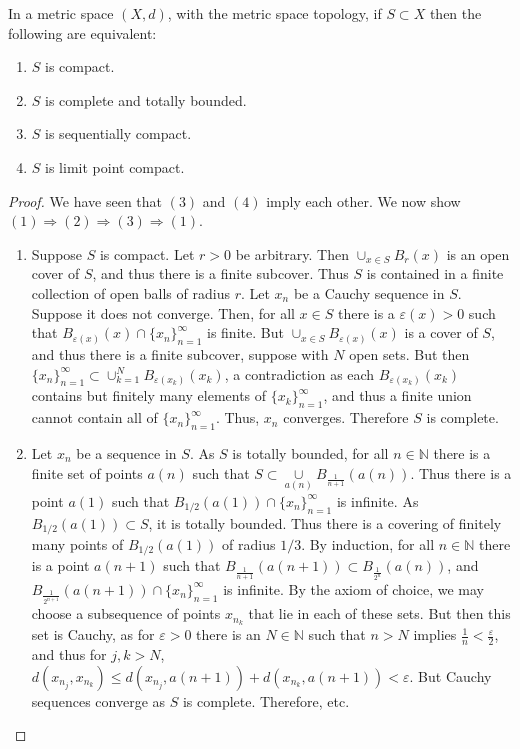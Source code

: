 \documentclass[crop=false,class=article,oneside]{standalone}
\begin{document}
        \begin{theorem}
        In a metric space $(X,d)$, with the metric space topology, if $S\subset X$ then the following are equivalent:
        \begin{enumerate}
        \item $S$ is compact.
        \item $S$ is complete and totally bounded.
        \item $S$ is sequentially compact.
        \item $S$ is limit point compact.
        \end{enumerate}
        \end{theorem}
        \begin{proof}
        We have seen that $(3)$ and $(4)$ imply each other. We now show $(1)\Rightarrow (2)\Rightarrow (3) \Rightarrow (1)$.
        \begin{enumerate}
        \item Suppose $S$ is compact. Let $r>0$ be arbitrary. Then $\cup_{x\in S}B_{r}(x)$ is an open cover of $S$, and thus there is a finite subcover. Thus $S$ is contained in a finite collection of open balls of radius $r$. Let $x_n$ be a Cauchy sequence in $S$. Suppose it does not converge. Then, for all $x\in S$ there is a $\varepsilon(x)>0$ such that $B_{\varepsilon(x)}(x)\cap \{x_n\}_{n=1}^{\infty}$ is finite. But $\cup_{x\in S}B_{\varepsilon(x)}(x)$ is a cover of $S$, and thus there is a finite subcover, suppose with $N$ open sets. But then $\{x_n\}_{n=1}^{\infty}\subset \cup_{k=1}^{N}B_{\varepsilon(x_k)}(x_k)$, a contradiction as each $B_{\varepsilon(x_k)}(x_k)$ contains but finitely many elements of $\{x_k\}_{n=1}^{\infty}$, and thus a finite union cannot contain all of $\{x_n\}_{n=1}^{\infty}$. Thus, $x_n$ converges. Therefore $S$ is complete.
        \item Let $x_n$ be a sequence in $S$. As $S$ is totally bounded, for all $n\in \mathbb{N}$ there is a finite set of points $a(n)$ such that $S\subset \underset{a(n)}\cup B_{\frac{1}{n+1}}(a(n))$. Thus there is a point $a(1)$ such that $B_{1/2}(a(1))\cap \{x_n\}_{n=1}^{\infty}$ is infinite. As $B_{1/2}(a(1))\subset S$, it is totally bounded. Thus there is a covering of finitely many points of $B_{1/2}(a(1))$ of radius $1/3$. By induction, for all $n\in \mathbb{N}$ there is a point $a(n+1)$ such that $B_{\frac{1}{n+1}}(a(n+1))\subset B_{\frac{1}{2^{n}}}(a(n))$, and $B_{\frac{1}{2^{n+1}}}(a(n+1))\cap \{x_n\}_{n=1}^{\infty}$ is infinite. By the axiom of choice, we may choose a subsequence of points $x_{n_k}$ that lie in each of these sets. But then this set is Cauchy, as for $\varepsilon>0$ there is an $N\in \mathbb{N}$ such that $n>N$ implies $\frac{1}{n}<\frac{\varepsilon}{2}$, and thus for $j,k>N$, $d(x_{n_j},x_{n_k})\leq d(x_{n_j},a(n+1))+d(x_{n_k},a(n+1))<\varepsilon$. But Cauchy sequences converge as $S$ is complete. Therefore, etc.

\end{enumerate}
\end{proof}
\end{document}
